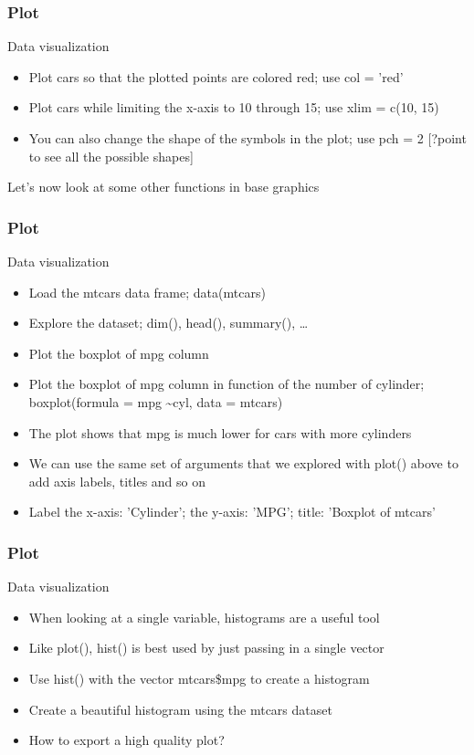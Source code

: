 \documentclass{beamer}
\begin{document}
\begin{frame}[fragile]
	\frametitle{Plot}
	\centering \Large Data visualization
	\begin{itemize}
		\small
		\item Plot cars so that the plotted points are colored red; use col = 'red'
	\pause 
		\item Plot cars while limiting the x-axis to 10 through 15; use xlim = c(10, 15)
	\pause
		\item You can also change the shape of the symbols in the plot; use pch = 2 \tiny [?point to see all the possible shapes]
	\end{itemize}

	\vspace{20pt}

	\begin{center} Let's now look at some other functions in base graphics \end{center}
\end{frame}


\begin{frame}[fragile]
	\frametitle{Plot}
	\centering \Large Data visualization
	\begin{itemize}
		\small
		\item Load the mtcars data frame; data(mtcars)
	\pause 
		\item Explore the dataset; dim(), head(), summary(), \ldots
	\pause
		\item Plot the boxplot of mpg column
	\pause
		\item Plot the boxplot of mpg column in function of the number of cylinder; boxplot(formula = mpg \textasciitilde cyl, data = mtcars)
	\pause
		\item The plot shows that mpg is much lower for cars with more cylinders
		\item We can use the same set of arguments that we explored with plot() above to add axis labels, titles and so on
		\item Label the x-axis: 'Cylinder'; the y-axis: 'MPG'; title: 'Boxplot of mtcars'
	\end{itemize}
\end{frame}

\begin{frame}[fragile]
	\frametitle{Plot}
	\centering \Large Data visualization
	\begin{itemize}
		\small
		\item When looking at a single variable, histograms are a useful tool
		\item Like plot(), hist() is best used by just passing in a single vector
		\item Use hist() with the vector mtcars\$mpg to create a histogram
	\pause
		\item Create a beautiful histogram using the mtcars dataset 
	\pause
		\item How to export a high quality plot?
	\end{itemize}
\end{frame}
\end{document}
